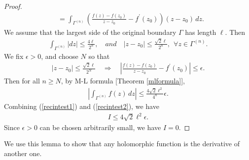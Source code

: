 \documentclass{article}
\numberwithin{equation}{section}
\theoremstyle{plain}
\theoremstyle{definition}
\begin{document}
\begin{proof}
\begin{align*}
	&=\int_{\Gamma^{(n)}}\left(\frac{f(z)-f(z_0)}{z-z_0}-f^\prime(z_0)\right)(z-z_0)\,dz.
\end{align*}
We assume that the largest side of the original boundary $\Gamma$ has length $\ell$. Then
\begin{align*}
	\int_{\Gamma^{(n)}}\vert dz\vert\leq\frac{4\ell}{2^n},\quad and\quad \vert z-z_0\vert\leq\frac{\sqrt{2}\ell}{2^n},\ \ \forall z\in\Gamma^{(n)}.
\end{align*}
We fix $\epsilon>0$, and choose $N$ so that
\begin{align*}
	\vert z-z_0\vert\leq\frac{\sqrt{2}\ell}{2^N}\quad\Rightarrow\quad\left\vert\frac{f(z)-f(z_0)}{z-z_0}-f^\prime(z_0)\right\vert\leq\epsilon.
\end{align*}
Then for all $n\geq N$, by M-L formula [Theorem \ref{mlformula}],
\begin{align}
	\left\vert\int_{\Gamma^{(n)}}f(z)\,dz\right\vert\leq\frac{4\sqrt{2}\ell^2}{4^n}\epsilon.\label{recintest2}
\end{align}
Combining (\ref{recintest1}) and (\ref{recintest2}), we have
\begin{align*}
	I\leq 4\sqrt{2}\ell^2\epsilon.
\end{align*}
Since $\epsilon>0$ can be chosen arbitrarily small, we have $I=0$.
\end{proof}

We use this lemma to show that any holomorphic function is the derivative of another one.
\end{document}
